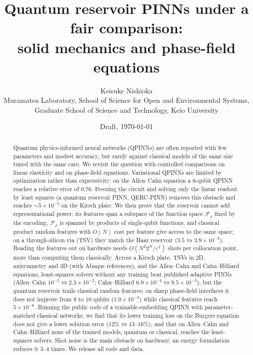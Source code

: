 \documentclass[11pt]{article}
\title{Quantum reservoir PINNs under a fair comparison:\\
\large solid mechanics and phase-field equations}
\author{Keisuke Nishioka \\ {Muramatsu Laboratory, School of Science for Open and Environmental Systems,}\\ {Graduate School of Science and Technology, Keio University}}
\date{Draft, \today}
\theoremstyle{remark}\newtheorem*{remark}{Remark}
\begin{document}
\maketitle

\begin{abstract}
Quantum physics-informed neural networks (QPINNs) are often reported with few parameters and modest accuracy,
but rarely against classical models of the same size tuned with the same care.
We revisit the question with controlled comparisons on linear elasticity and on phase-field equations.
Variational QPINNs are limited by optimization rather than expressivity: on the Allen--Cahn equation a 6-qubit
QPINN reaches a relative error of 0.76.
Freezing the circuit and solving only the linear readout by least squares (a quantum reservoir PINN, QERC-PINN)
removes this obstacle and reaches $\sim\!5\times10^{-5}$ on the Kirsch plate.
We then prove that the reservoir cannot add representational power: its features span a subspace of the function
space $\mathcal F_\rho$ fixed by the encoding, $\mathcal F_\rho$ is spanned by products of single-qubit functions,
and classical product random features with $O(N)$ cost per feature give access to the same space; on a
through-silicon via (TSV) they match the Haar reservoir ($3.5$ vs $3.9\times10^{-3}$).
Reading the features out on hardware needs $O(N^2 2^N/\varepsilon^2)$ shots per collocation point, more than
computing them classically.
Across a Kirsch plate, TSVs in 2D, axisymmetry and 3D (with Abaqus references), and the Allen--Cahn and
Cahn--Hilliard equations, least-squares solvers without any training beat published adaptive PINNs
(Allen--Cahn $10^{-3}$ vs $2.3\times10^{-2}$; Cahn--Hilliard $6.9\times10^{-4}$ vs $9.5\times10^{-3}$),
but the quantum reservoir trails classical random features; on sharp phase-field interfaces it does not improve
from 8 to 10 qubits ($1.0\times10^{-2}$) while classical features reach $5\times10^{-6}$.
Running the public code of a trainable-embedding QPINN with parameter-matched classical networks, we find that its lower
training loss on the Burgers equation does not give a lower solution error ($12\%$ vs $13$--$16\%$), and that
on Allen--Cahn and Cahn--Hilliard none of the trained models, quantum or classical, reaches the least-squares solvers.
Shot noise is the main obstacle on hardware; an energy formulation reduces it 3--4 times.
We release all code and data.
\end{abstract}

\end{document}

